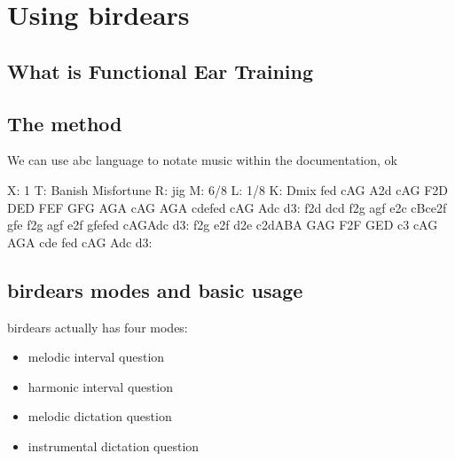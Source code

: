 \documentclass[letterpaper,10pt,english]{sphinxmanual}
\begin{document}
\chapter{Using birdears}
\label{\detokenize{using:using-birdears}}\label{\detokenize{using::doc}}

\section{What is Functional Ear Training}
\label{\detokenize{using:what-is-functional-ear-training}}


\section{The method}
\label{\detokenize{using:the-method}}
We can use abc language to notate music within the documentation, ok

%
\begin{sphinxVerbatim}[commandchars=\\\{\}]
X: 1
T: Banish Misfortune
R: jig
M: 6/8
L: 1/8
K: Dmix
fed cAG\textbar{} A2d cAG\textbar{} F2D DED\textbar{} FEF GFG\textbar{}
AGA cAG\textbar{} AGA cde\textbar{}fed cAG\textbar{} Ad\PYGZca{}c d3:\textbar{}
f2d d\PYGZca{}cd\textbar{} f2g agf\textbar{} e2c cBc\textbar{}e2f gfe\textbar{}
f2g agf\textbar{} e2f gfe\textbar{}fed cAG\textbar{}Ad\PYGZca{}c d3:\textbar{}
f2g e2f\textbar{} d2e c2d\textbar{}ABA GAG\textbar{} F2F GED\textbar{}
c3 cAG\textbar{} AGA cde\textbar{} fed cAG\textbar{} Ad\PYGZca{}c d3:\textbar{}
\end{sphinxVerbatim}


\section{birdears modes and basic usage}
\label{\detokenize{using:birdears-modes-and-basic-usage}}
birdears actually has four modes:
\begin{itemize}
\item {} 
melodic interval question

\item {} 
harmonic interval question

\item {} 
melodic dictation question

\item {} 
instrumental dictation question

\end{itemize}
\end{document}
